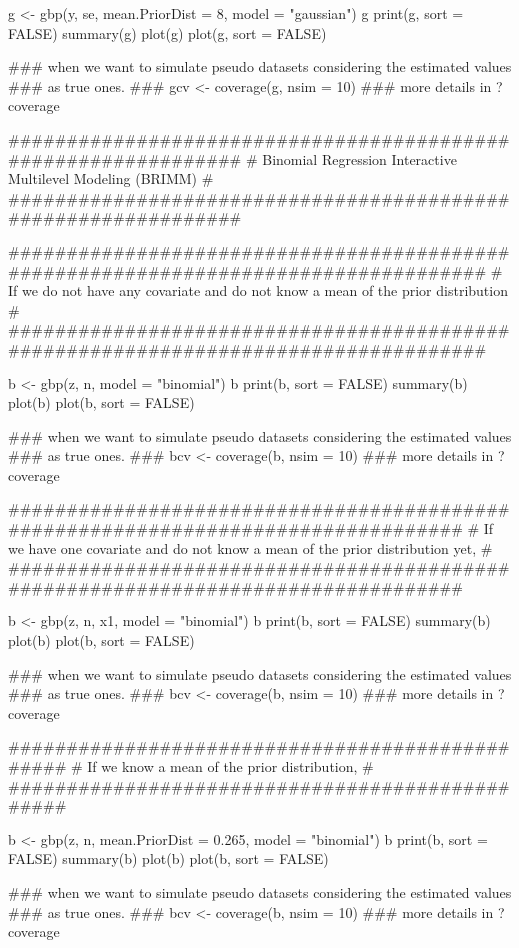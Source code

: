\documentclass[a4paper]{book}
\begin{document}
\begin{Examples}
\begin{ExampleCode}
    g <- gbp(y, se, mean.PriorDist = 8, model = "gaussian")
    g
    print(g, sort = FALSE)
    summary(g)
    plot(g)
    plot(g, sort = FALSE)

    ### when we want to simulate pseudo datasets considering the estimated values 
    ### as true ones.
    ### gcv <- coverage(g, nsim = 10)  
    ### more details in ?coverage 

  ###############################################################
  # Binomial Regression Interactive Multilevel Modeling (BRIMM) #
  ###############################################################

    ####################################################################################
    # If we do not have any covariate and do not know a mean of the prior distribution #
    ####################################################################################

    b <- gbp(z, n, model = "binomial")
    b
    print(b, sort = FALSE)
    summary(b)
    plot(b)
    plot(b, sort = FALSE)

    ### when we want to simulate pseudo datasets considering the estimated values 
    ### as true ones.
    ### bcv <- coverage(b, nsim = 10)  
    ### more details in ?coverage 

    ##################################################################################
    # If we have one covariate and do not know a mean of the prior distribution yet, #
    ##################################################################################

    b <- gbp(z, n, x1, model = "binomial")
    b
    print(b, sort = FALSE)
    summary(b)
    plot(b)
    plot(b, sort = FALSE)

    ### when we want to simulate pseudo datasets considering the estimated values 
    ### as true ones.
    ### bcv <- coverage(b, nsim = 10)  
    ### more details in ?coverage 

    ################################################
    # If we know a mean of the prior distribution, #
    ################################################

    b <- gbp(z, n, mean.PriorDist = 0.265, model = "binomial")
    b
    print(b, sort = FALSE)
    summary(b)
    plot(b)
    plot(b, sort = FALSE)

    ### when we want to simulate pseudo datasets considering the estimated values 
    ### as true ones.
    ### bcv <- coverage(b, nsim = 10)  
    ### more details in ?coverage 


\end{ExampleCode}
\end{Examples}
\end{document}
